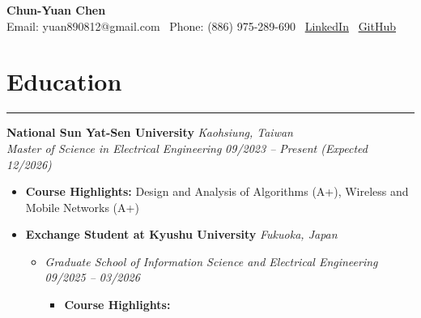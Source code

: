 \documentclass[12pt]{article}
\begin{document}
\begin{center}
    {\Large \textbf{Chun-Yuan Chen}}\\
    \vspace{5pt}
    Email: yuan890812@gmail.com \textbar \ Phone: (886) 975-289-690 \textbar \
    {\href{http://www.linkedin.com/in/chun-yuan-chen-11a7b1216/}{LinkedIn}} \textbar \
    {\href{https://github.com/Yuan081222222?tab=repositories}{GitHub}}
\end{center}

\section*{\textbf{Education}}
\vspace{-3pt}
\hrule
\vspace{10pt}

\textbf{National Sun Yat-Sen University} \hfill \textit{Kaohsiung, Taiwan}\\
\textit{Master of Science in Electrical Engineering} \hfill \textit{09/2023 -- Present (Expected 12/2026)}

\vspace{3pt}

\begin{itemize}[leftmargin=16pt, topsep=2pt, itemsep=0pt]
    \item \textbf{Course Highlights:} Design and Analysis of Algorithms (A+), Wireless and Mobile Networks (A+)
\end{itemize}

\vspace{1pt}

\begin{itemize}[leftmargin=16pt, topsep=2pt, itemsep=1pt, parsep=1pt, partopsep=0pt]
    \item \textbf{Exchange Student at Kyushu University} \hfill \textit{Fukuoka, Japan}
    \begin{itemize}[leftmargin=16pt]
        \item \textit{Graduate School of Information Science and Electrical Engineering} \hfill \textit{09/2025 -- 03/2026}
        \begin{itemize}[leftmargin=16pt]
            \item \textbf{Course Highlights:} 
        \end{itemize}
    \end{itemize}
\end{itemize}

\vspace{3pt}
\end{document}
